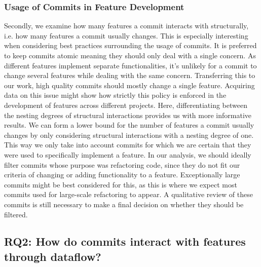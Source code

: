 \subsubsection*{Usage of Commits in Feature Development}

Secondly, we examine how many features a commit interacts with structurally, i.e. how many features a commit usually changes. 
This is especially interesting when considering best practices surrounding the usage of commits.
It is preferred to keep commits atomic\cite{hundhausen2021commit_metrics} meaning they should only deal with a single concern.
As different features implement separate functionalities, it's unlikely for a commit to change several features while dealing with the same concern.
Transferring this to our work, high quality commits should mostly change a single feature.
Acquiring data on this issue might show how strictly this policy is enforced in the development of features across different projects. 
Here, differentiating between the nesting degrees of structural interactions provides us with more informative results. 
We can form a lower bound for the number of features a commit usually changes by only considering structural interactions with a nesting degree of one.
This way we only take into account commits for which we are certain that they were used to specifically implement a feature.
In our analysis, we should ideally filter commits whose purpose was refactoring code, since they do not fit our criteria of changing or adding functionality to a feature.
Exceptionally large commits might be best considered for this, as this is where we expect most commits used for large-scale refactoring to appear.
A qualitative review of these commits is still necessary to make a final decision on whether they should be filtered.

\subsection*{\textbf{RQ2: How do commits interact with features through dataflow?}}

